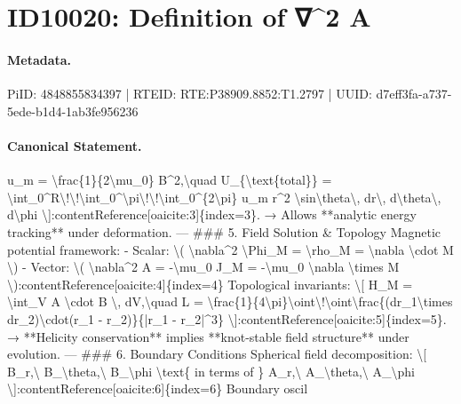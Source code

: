 \section*{ID10020: Definition of ∇\textasciicircum{}2 A}
\paragraph{Metadata.}
PiID: 4848855834397 | RTEID: RTE:P38909.8852:T1.2797 | UUID: d7eff3fa-a737-5ede-b1d4-1ab3fe956236

\paragraph{Canonical Statement.}
u\_m = \textbackslash{}frac\{1\}\{2\textbackslash{}mu\_0\} B\textasciicircum{}2,\textbackslash{}quad U\_\{\textbackslash{}text\{total\}\} = \textbackslash{}int\_0\textasciicircum{}R\textbackslash{}!\textbackslash{}!\textbackslash{}int\_0\textasciicircum{}\textbackslash{}pi\textbackslash{}!\textbackslash{}!\textbackslash{}int\_0\textasciicircum{}\{2\textbackslash{}pi\} u\_m r\textasciicircum{}2 \textbackslash{}sin\textbackslash{}theta\textbackslash{}, dr\textbackslash{}, d\textbackslash{}theta\textbackslash{}, d\textbackslash{}phi \textbackslash{}]:contentReference[oaicite:3]\{index=3\}. → Allows **analytic energy tracking** under deformation. --- \#\#\# 5. Field Solution \& Topology Magnetic potential framework: - Scalar: \textbackslash{}( \textbackslash{}nabla\textasciicircum{}2 \textbackslash{}Phi\_M = \textbackslash{}rho\_M = \textbackslash{}nabla \textbackslash{}cdot M \textbackslash{}) - Vector: \textbackslash{}( \textbackslash{}nabla\textasciicircum{}2 A = -\textbackslash{}mu\_0 J\_M = -\textbackslash{}mu\_0 \textbackslash{}nabla \textbackslash{}times M \textbackslash{}):contentReference[oaicite:4]\{index=4\} Topological invariants: \textbackslash{}[ H\_M = \textbackslash{}int\_V A \textbackslash{}cdot B \textbackslash{}, dV,\textbackslash{}quad L = \textbackslash{}frac\{1\}\{4\textbackslash{}pi\}\textbackslash{}oint\textbackslash{}!\textbackslash{}oint\textbackslash{}frac\{(dr\_1\textbackslash{}times dr\_2)\textbackslash{}cdot(r\_1 - r\_2)\}\{|r\_1 - r\_2|\textasciicircum{}3\} \textbackslash{}]:contentReference[oaicite:5]\{index=5\}. → **Helicity conservation** implies **knot-stable field structure** under evolution. --- \#\#\# 6. Boundary Conditions Spherical field decomposition: \textbackslash{}[ B\_r,\textbackslash{} B\_\textbackslash{}theta,\textbackslash{} B\_\textbackslash{}phi \textbackslash{}text\{ in terms of \} A\_r,\textbackslash{} A\_\textbackslash{}theta,\textbackslash{} A\_\textbackslash{}phi \textbackslash{}]:contentReference[oaicite:6]\{index=6\} Boundary oscil

